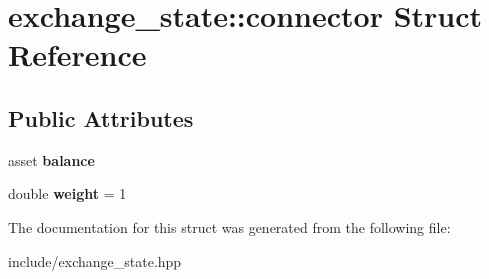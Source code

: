 \hypertarget{structexchange__state_1_1connector}{}\section{exchange\+\_\+state\+:\+:connector Struct Reference}
\label{structexchange__state_1_1connector}
\subsection*{Public Attributes}
\begin{DoxyCompactItemize}
\item 
\mbox{\label{structexchange__state_1_1connector_acff5aa7b2a08972035cf573a67c1253b}} 
asset {\bfseries balance}
\item 
\mbox{\label{structexchange__state_1_1connector_aaefdf596a43f0b04a3193a9831a399b1}} 
double {\bfseries weight} = 1
\end{DoxyCompactItemize}


The documentation for this struct was generated from the following file\+:\begin{DoxyCompactItemize}
\item 
include/exchange\+\_\+state.\+hpp\end{DoxyCompactItemize}
